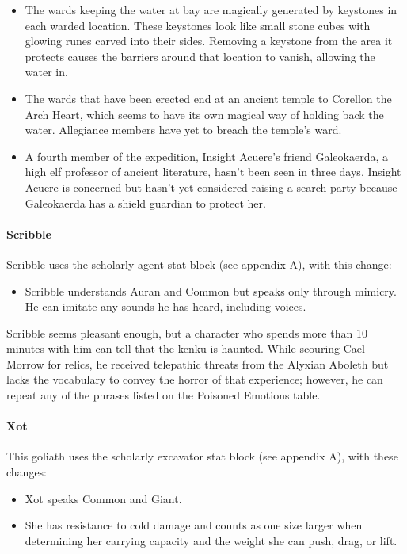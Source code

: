 \documentclass[10pt,a4paper,twoside,bg=print,twocolumn,openany,nodeprecatedcode]{dndbook}
\begin{document}
\begin{itemize}
\item The wards keeping the water at bay are magically generated by keystones in each warded location. These keystones look like small stone cubes with glowing runes carved into their sides. Removing a keystone from the area it protects causes the barriers around that location to vanish, allowing the water in.
\item The wards that have been erected end at an ancient temple to Corellon the Arch Heart, which seems to have its own magical way of holding back the water. Allegiance members have yet to breach the temple's ward.
\item A fourth member of the expedition, Insight Acuere's friend Galeokaerda, a high elf professor of ancient literature, hasn't been seen in three days. Insight Acuere is concerned but hasn't yet considered raising a search party because Galeokaerda has a shield guardian to protect her.
\end{itemize}

\paragraph{Scribble}
Scribble uses the scholarly agent stat block (see appendix A), with this change:


\begin{itemize}
\item Scribble understands Auran and Common but speaks only through mimicry. He can imitate any sounds he has heard, including voices.
\end{itemize}

Scribble seems pleasant enough, but a character who spends more than 10 minutes with him can tell that the kenku is haunted. While scouring Cael Morrow for relics, he received telepathic threats from the Alyxian Aboleth but lacks the vocabulary to convey the horror of that experience; however, he can repeat any of the phrases listed on the Poisoned Emotions table.

\paragraph{Xot}
This goliath uses the scholarly excavator stat block (see appendix A), with these changes:


\begin{itemize}
\item Xot speaks Common and Giant.
\item She has resistance to cold damage and counts as one size larger when determining her carrying capacity and the weight she can push, drag, or lift.
\end{itemize}
\end{document}

